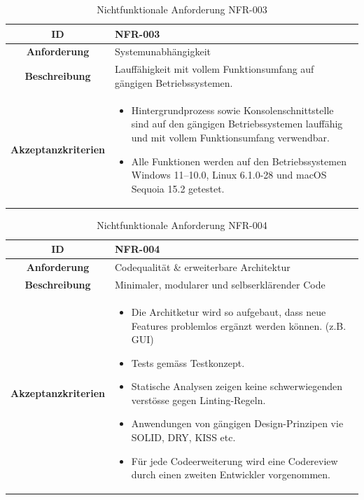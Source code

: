 \documentclass[a4paper,12pt]{report}
\begin{document}
    \begin{table}[h!]
        \centering
        \setlength{\leftmargini}{0.4cm}
        \begin{tabular}{|c|p{10cm}|}
            \hline
            \textbf{ID}           & NFR-003                                                                 \\ \hline
            \textbf{Anforderung}  & Systemunabhängigkeit                                                    \\ \hline
            \textbf{Beschreibung} & Lauffähigkeit mit vollem Funktionsumfang auf gängigen Betriebssystemen. \\ \hline
            \textbf{Akzeptanzkriterien} &
            \begin{itemize}
                \item Hintergrundprozess sowie Konsolenschnittstelle sind auf den gängigen Betriebssystemen lauffähig und mit vollem Funktionsumfang verwendbar.
                \item Alle Funktionen werden auf den Betriebssystemen Windows 11--10.0, Linux 6.1.0-28 und macOS Sequoia 15.2 getestet.
            \end{itemize}
            \\ \hline
        \end{tabular}
        \caption{Nichtfunktionale Anforderung NFR-003}\label{tab:table5}
    \end{table}
    \clearpage
    \begin{table}[h!]
        \centering
        \setlength{\leftmargini}{0.4cm}
        \begin{tabular}{|c|p{10cm}|}
            \hline
            \textbf{ID}           & NFR-004                                        \\ \hline
            \textbf{Anforderung}  & Codequalität \& erweiterbare Architektur       \\ \hline
            \textbf{Beschreibung} & Minimaler, modularer und selbserklärender Code \\ \hline
            \textbf{Akzeptanzkriterien} &
            \begin{itemize}
                \item Die Architketur wird so aufgebaut, dass neue Features problemlos ergänzt werden können. (z.B. GUI)
                \item Tests gemäss Testkonzept.
                \item Statische Analysen zeigen keine schwerwiegenden verstösse gegen Linting-Regeln.
                \item Anwendungen von gängigen Design-Prinzipen vie SOLID, DRY, KISS etc.
                \item Für jede Codeerweiterung wird eine Codereview durch einen zweiten Entwickler vorgenommen.
            \end{itemize}
            \\ \hline
        \end{tabular}
        \caption{Nichtfunktionale Anforderung NFR-004}\label{tab:table6}
    \end{table}
\end{document}

